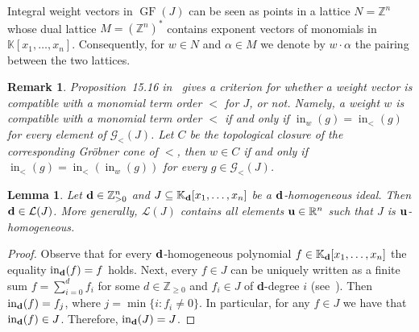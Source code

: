\documentclass[pdftex]{sigma}%
\newtheorem{Lemma}[Theorem]{Lemma}
\newtheorem{Remark}[Theorem]{Remark}}
\numberwithin{equation}{section}
\DeclareMathOperator{\init}{in}
\DeclareMathOperator{\GF}{GF}
\begin{document}
Integral weight vectors in $\GF(J)$ can be seen as points in a lattice $N=\mathbb Z^n$ whose dual lattice $M=(\mathbb Z^n)^*$ contains exponent vectors of monomials in $\mathbb K[x_1,\dots,x_n]$.
Consequently, for $w\in N$ and $\alpha\in M$ we denote by $w\cdot \alpha$ the pairing between the two lattices.

\begin{Remark}\label{rem:Eisenbud}
Proposition~15.16 in~\cite{eisenbud2013commutative} gives a criterion for whether a weight vector is compatible with a monomial term order $<$ for $J$, or not. Namely, a weight $w$ is compatible with a monomial term order $<$ if and only if $\init_w(g)=\init_{<}(g)$ for every element of $\mathcal{G}_<(J)$. Let $C$ be the topological closure of the corresponding Gr\"obner cone of $<$, then $w\in C$ if and only if $\init_<(g)=\init_<(\init_w(g))$ for every $g\in \mathcal{G}_<(J)$.
\end{Remark}

\begin{Lemma}
Let ${\bf d}\in \mathbb Z_{>0}^n$ and $J\subseteq \mathbb K_{\bf d}[x_1, \dots , x_n]$ be a ${\bf d}$-homogeneous ideal. Then ${\bf d} \in \mathcal{L}(J)$.
More generally, $\mathcal L(J)$ contains all elements ${\bf u}\in \mathbb R^n$ such that $J$ is ${\bf u}$-homogeneous.
\end{Lemma}
\begin{proof}
Observe that for every ${\bf d}$-homogeneous polynomial $f\in \mathbb K_{\bf d}[x_1, \dots , x_n]$ the equality $\init_{\bf d}(f)=f$ holds.
Next, every $f \in J$ can be uniquely written as a finite sum $f=\sum_{i=0}^{d} f_i$ for some $d\in \mathbb Z_{\geq 0}$ and $f_i\in J$ of {\bf d}-degree $i$ (see~\cite[Lemma~3.0.7]{Hosgood}).
Then $\init_{\bf d}(f)=f_j$, where $j=\min\{ i \colon f_i \neq 0\} $.
In particular, for any $f \in J $ we have that $\init_{\bf d}(f) \in J$.
Therefore, $\init_{\bf d}(J )= J$.
\end{proof}
\end{document}
